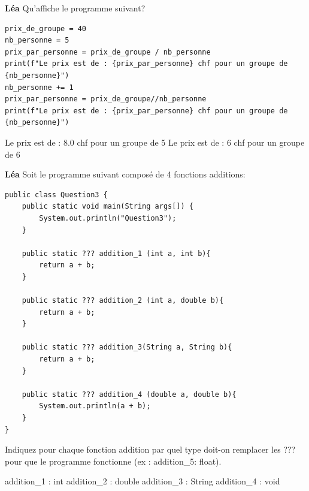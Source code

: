 \begin{Exercice}[5 minutes]\textbf{Léa}
Qu'affiche le programme suivant?

\begin{lstlisting}[style=pythonstyle]
prix_de_groupe = 40
nb_personne = 5
prix_par_personne = prix_de_groupe / nb_personne
print(f"Le prix est de : {prix_par_personne} chf pour un groupe de {nb_personne}")
nb_personne += 1
prix_par_personne = prix_de_groupe//nb_personne
print(f"Le prix est de : {prix_par_personne} chf pour un groupe de {nb_personne}") 
\end{lstlisting}

\begin{solution}
Le prix est de : 8.0 chf pour un groupe de 5 \newline 
   Le prix est de : 6 chf pour un groupe de 6
\end{solution}
\end{Exercice}

\begin{Exercice}[5 minutes]\textbf{Léa}
Soit le programme suivant composé de 4 fonctions additions:

\begin{lstlisting}[style=javastyle]
public class Question3 {
    public static void main(String args[]) {
        System.out.println("Question3");
    }

    public static ??? addition_1 (int a, int b){
        return a + b;
    }

    public static ??? addition_2 (int a, double b){
        return a + b;
    }

    public static ??? addition_3(String a, String b){
        return a + b;
    }

    public static ??? addition_4 (double a, double b){
        System.out.println(a + b);
    }
}
\end{lstlisting}

Indiquez pour chaque fonction addition par quel type doit-on remplacer les ??? pour que le programme fonctionne (ex : addition\_5: float).

\begin{solution}
addition\_1 : int \newline 
addition\_2 : double \newline 
addition\_3 : String \newline 
addition\_4 : void
\end{solution}


\end{Exercice}

